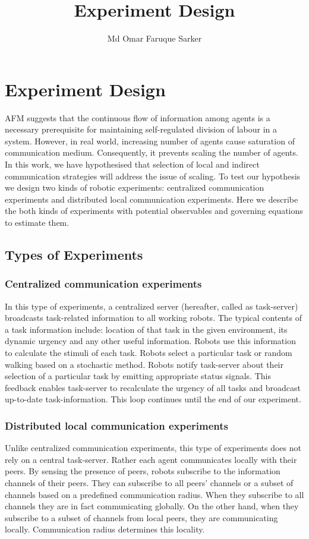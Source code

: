 \documentclass[11pt,a4paper]{report}
\author{Md Omar Faruque Sarker}
\title{Experiment Design}
\begin{document}
\chapter{Experiment Design}
AFM suggests that the continuous flow of information among agents is a necessary prerequisite for maintaining self-regulated division of labour in a system. However, in real world, increasing number of agents cause saturation of communication medium. Consequently, it prevents scaling the number of agents. In this work, we have hypothesised that selection of local and indirect communication strategies will address the issue of scaling. To test our hypothesis we design two kinds of robotic experiments: centralized communication experiments and distributed local communication experiments. Here we describe the both kinds of experiments with potential observables and governing equations to estimate them.
%
\section{Types of Experiments}
\subsection{Centralized communication experiments}
In this type of experiments, a centralized server  (hereafter, called as task-server) broadcasts  task-related information to all working robots. The typical contents of a task information include: location of that task in the given environment, its dynamic urgency and any other useful information. Robots use this information to  calculate the stimuli of each task. Robots select a particular task or random walking  based on a stochastic method. Robots notify task-server about their selection of a particular task by emitting appropriate status signals. This feedback enables task-server to recalculate  the urgency of all tasks and broadcast up-to-date task-information. This loop continues until the end of our experiment.
%
\subsection{Distributed local communication experiments}
Unlike centralized communication experiments, this type of experiments does not rely on a central task-server. Rather each agent communicates locally with their peers.  By sensing the presence of peers, robots subscribe to the information channels of their peers. They can subscribe to all peers' channels  or a subset of channels based on a predefined communication radius.  When they subscribe to all channels they are in fact communicating globally. On the other hand, when they subscribe to a subset of channels from local peers, they are communicating locally. Communication radius determines this locality. 
\end{document}
